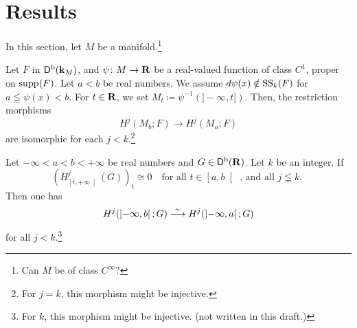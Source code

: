 \section{Results}

In this section, 
let \(M\) be a manifold.\footnote{
  Can \(M\) be of class \(C^\infty\)?
}

\begin{Theorem+}\label{thm:t-morse}
  Let \(F\) in \(\Dompb(\kk_M)\), and 
  \(\psi\colon M\to \rr\) be a real-valued function of 
  class \(C^1\), 
  proper on \(\supp(F)\). 
  Let \(a<b\) be real numbers.
  We assume \(d\psi(x)\notin \muS[k](F)\) for \(
    a\leqq \psi(x)<b
  \). For \(t\in \rr\), we set \(
    M_t\coloneqq\psi^{-1}\left(]-\infty,t[\right)
  \). 
  Then, the restriction morphisms\[
    H^{j}(M_{b};F)\to H^{j}(M_{a};F)
  \]
  are isomorphic for each \(j< k\).\footnote{
    For \(j=k\), this morphism might be injective.
  }
\end{Theorem+}

\begin{Lemma+}\label{Lem:1d-t-morse}
  Let \(-\infty<a<b<+\infty\) be real numbers 
  and \(G\in \Dompb(\rr)\). Let \(k\) be an integer.
  If \[
      \left(H^{j}_{\left[t,+\infty\right[}(G)\right)_t
      \cong 0
      \quad
      \text{
          for all \(t\in\left[a,b\right[\) , 
          and all \(j\leqq k\).
      }
  \]
  Then one has \[
      H^{j}(\left]-\infty,b\right[;G)\simarr
      H^{j}(\left]-\infty,a\right[;G)
  \] for all \(j<k\).\footnote{
      For \(k\), this morphism might be injective.
        (not written in this draft.)
  }
\end{Lemma+}

